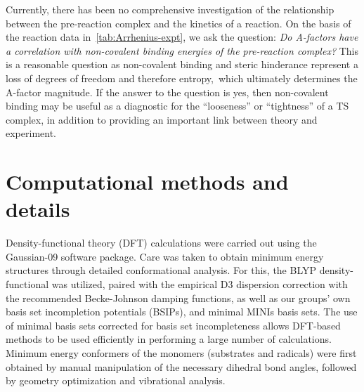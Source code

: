 \begin{doublespace}
Currently, there has been no comprehensive investigation of the relationship
between the pre-reaction complex and the kinetics of a reaction. On the basis of
the reaction data in~\ref{tab:Arrhenius-expt}, we ask the question: \emph{Do
A-factors have a correlation with non-covalent binding energies of the
pre-reaction complex?} This is a reasonable question as non-covalent binding and
steric hinderance represent a loss of degrees of freedom and therefore
entropy,\footnotemark\ which ultimately determines the A-factor magnitude. If
the answer to the question is yes, then non-covalent binding may be useful as a
diagnostic for the ``looseness'' or ``tightness'' of a TS complex, in addition
to providing an important link between theory and experiment.



\section{Computational methods and details}

Density-functional theory (DFT) calculations were carried out using the
Gaussian-09 software package.\cite{Frisch2009} Care was taken to obtain minimum
energy structures through detailed conformational analysis. For this, the BLYP
density-functional\cite{Becke1988,Lee1988} was utilized, paired with the
empirical D3 dispersion correction\cite{Grimme2010} with the recommended
Becke-Johnson damping functions,\cite{Johnson2006} as well as our groups' own
basis set incompletion potentials (BSIPs),\cite{OterodelaRoza2017ACP} and
minimal MINIs basis sets.\cite{Huzinaga1984} The use of minimal basis sets
corrected for basis set incompleteness allows DFT-based methods to be used
efficiently in performing a large number of calculations. Minimum energy
conformers of the monomers (substrates and radicals) were first obtained by
manual manipulation of the necessary dihedral bond angles, followed by geometry
optimization and vibrational analysis.


\end{doublespace}
